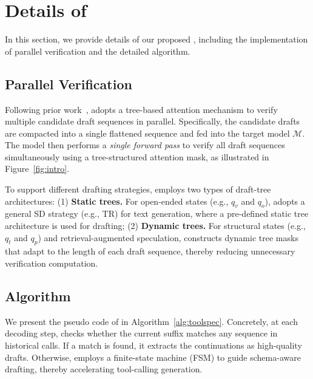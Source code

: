 \section{Details of \method}
\label{appendix:method_details}
In this section, we provide details of our proposed \method, including the implementation of parallel verification and the detailed algorithm.

\subsection{Parallel Verification}
Following prior work~\citep{eagle, medusa}, \method adopts a tree-based attention mechanism to verify multiple candidate draft sequences in parallel. Specifically, the candidate drafts are compacted into a single flattened sequence and fed into the target model $\mathcal{M}$. The model then performs a \textit{single forward pass} to verify all draft sequences simultaneously using a tree-structured attention mask, as illustrated in Figure~\ref{fig:intro}. 

To support different drafting strategies, \method employs two types of draft-tree architectures: (1) \textbf{Static trees.} For open-ended states (e.g., $q_v$ and $q_o$), \method adopts a general SD strategy (e.g., TR) for text generation, where a pre-defined static tree architecture is used for drafting; (2) \textbf{Dynamic trees.} For structural states (e.g., $q_t$ and $q_p$) and retrieval-augmented speculation, \method constructs dynamic tree masks that adapt to the length of each draft sequence, thereby reducing unnecessary verification computation.

\subsection{Algorithm}
We present the pseudo code of \method in Algorithm~\ref{alg:toolspec}. Concretely, at each decoding step, \method checks whether the current suffix matches any sequence in historical calls. If a match is found, it extracts the continuations as high-quality drafts. Otherwise, \method employs a finite-state machine (FSM) to guide schema-aware drafting, thereby accelerating tool-calling generation.